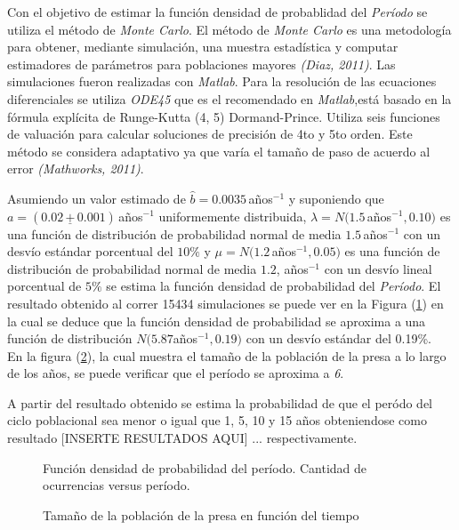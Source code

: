 \documentclass{SPANISH_acm_proc_article-sp}
\begin{document}
\label{sec:estimacion}
Con el objetivo de estimar la funci\'on densidad de probablidad del \emph{Per\'iodo}
se utiliza el m\'etodo de \textit{Monte Carlo}. El m\'etodo de \textit{Monte Carlo} es una metodolog\'ia
para obtener, mediante simulaci\'on, una muestra estad\'istica y computar estimadores
de par\'ametros para poblaciones mayores \textit{(Diaz, 2011)}. Las simulaciones fueron
realizadas con \textit{Matlab}. Para la resoluci\'on de las ecuaciones diferenciales se
 utiliza \textit{ODE45} que es el recomendado en
\textit{Matlab},est\'a basado en la f\'ormula expl\'icita de Runge-Kutta (4, 5) Dormand-Prince. Utiliza seis
funciones de valuaci\'on para calcular soluciones de precisi\'on de 4to y 5to orden. Este m\'etodo se considera
adaptativo ya que var\'ia el tama\~no de paso de acuerdo al error \textit{(Mathworks, 2011)}.

Asumiendo un valor estimado de $ \hat b = 0.0035 \, $a\~nos$^{-1} $ y suponiendo que
$ a = (0.02 \, \underline{+} \, 0.001) \, $a\~nos$^{-1}$ uniformemente distribuida,
$ \lambda = N(1.5 \, $a\~nos$^{-1}, 0.10) $ es una funci\'on de distribuci\'on de probabilidad normal de media
$ 1.5 \, $a\~nos$^{-1} $ con un desv\'io est\'andar porcentual del $ 10\% $ y
$ \mu = N(1.2 \, $a\~nos$^{-1}, 0.05) $ es una funci\'on de distribuci\'on de probabilidad normal de media $ 1.2$, a\~nos$^{-1}$ con un desv\'io lineal porcentual de $5\%$ se estima
la funci\'on densidad de probabilidad del \emph{Per\'iodo}. El resultado obtenido al correr
15434 simulaciones se puede ver en la Figura (\ref{fig:histo}) en la cual se deduce que la funci\'on densidad de probabilidad se aproxima a una funci\'on de distribuci\'on $N(5.87$a\~nos$^{-1}, 0.19)$ con un desv\'io est\'andar del 0.19\%.\\

En la figura (\ref{fig:presa}), la cual muestra el tama\~no de la poblaci\'on de la presa a lo largo de los a\~nos, se puede verificar que el per\'iodo se aproxima a \textit{6}.

A partir del resultado obtenido se estima la probabilidad de que el per\'odo del ciclo
poblacional sea menor o igual que 1, 5, 10 y 15 a\~nos obteniendose como resultado
[INSERTE RESULTADOS AQUI] ... respectivamente.
\begin{figure}
\centering
\label{fig:histo}
\caption{Funci\'on densidad de probabilidad del per\'iodo. Cantidad de ocurrencias versus per\'iodo.}
\end{figure}

\begin{figure}
\centering
\label{fig:presa}
\caption{Tama\~no de la poblaci\'on de la presa en funci\'on del tiempo}
\end{figure}
\end{document}
